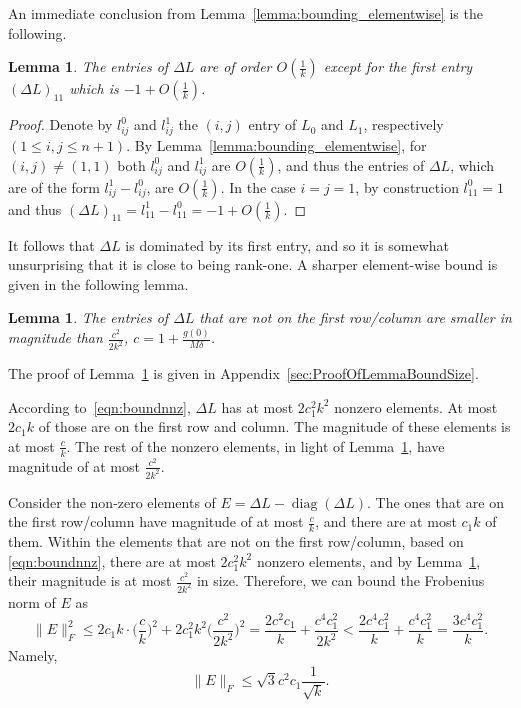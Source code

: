 \documentclass[11pt]{article}
\newtheorem{lemma}[theorem]{Lemma}
\begin{document}
An immediate conclusion from Lemma~\ref{lemma:bounding_elementwise} is the following.
\begin{lemma} \label{lemma:entries}
The entries of $\Delta L$ are of order $O(\frac1k)$ except for the first entry $(\Delta L )_{11}$ which is $-1 + O(\frac1k)$.
\end{lemma}
\begin{proof}
Denote by $l^0_{ij}$ and $l^1_{ij}$ the $(i,j)$ entry of $L_0$ and $L_1$, respectively $(1 \leq i,j \leq n + 1)$. By Lemma~\ref{lemma:bounding_elementwise}, for $(i,j) \neq (1,1)$ both $l^0_{ij}$ and $ l^1_{ij}$ are $O(\frac1k)$, and thus the entries of $\Delta L$, which are of the form  $l^1_{ij} - l^0_{ij}$, are $O(\frac1k)$. In the case $i=j=1$, by construction $l^0_{11} = 1$ and thus $(\Delta L )_{11} = l^1_{11} - l^0_{11} = -1 + O(\frac1k)$. 
\end{proof}
It follows that $\Delta L$ is dominated by its first entry, and so it is somewhat unsurprising that it is close to being rank-one. A sharper element-wise bound is given in the following lemma.
\begin{lemma} \label{lem:boundsize}
The entries of $\Delta L$ that are not on the first row/column are smaller in magnitude than $\frac{c^2}{2k^2}$, $c = 1+ \frac{g(0)}{M\delta}$.
\end{lemma}
The proof of Lemma~\ref{lem:boundsize} is given in Appendix~\ref{sec:ProofOfLemmaBoundSize}.

According to~\eqref{eqn:boundnnz}, $\Delta L$ has at most $2c_1^2k^2$ nonzero elements. At most $2c_1k$ of those are on the first row and column. The magnitude of these elements is at most $\frac{c}{k}$. The rest of the nonzero elements, in light of Lemma~\ref{lem:boundsize}, have magnitude of at most $\frac{c^2}{2k^2}$.

Consider the non-zero elements of $E = \Delta L - \operatorname{diag}(\Delta L)$. The ones that are on the first row/column have magnitude of at most $\frac{c}{k}$, and there are at most $c_1k$ of them. Within the elements that are not on the first row/column, based on \eqref{eqn:boundnnz}, there are at most $2c_1^2k^2$ nonzero elements, and by Lemma~\ref{lem:boundsize}, their magnitude is at most $\frac{c^2}{2k^2}$ in size. Therefore, we can bound the Frobenius norm of $E$ as
\begin{equation}
\|E\|_F^2 \leq 2c_1k \cdot \Bigg( \frac{c}{k} \Bigg) ^2  +   2c_1^2k^2 \Bigg( \frac{c^2}{2k^2} \Bigg) ^2 = \frac{2c^2c_1}{k} + \frac{c^4c_1^2}{2k^2} < \frac{2c^4c_1^2}{k} + \frac{c^4c_1^2}{k} = \frac{3c^4c_1^2}{k} . 
\end{equation}
Namely,
\begin{equation}
 \|E\|_F \leq \sqrt{3}c^2c_1\frac{1}{\sqrt{k}} .
\end{equation}
\end{document}
